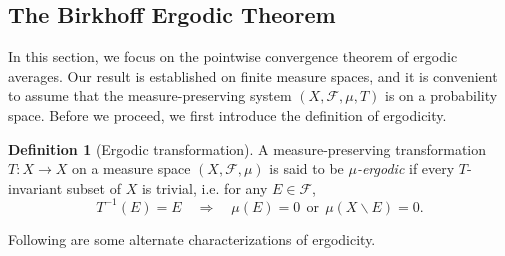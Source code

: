 \documentclass{article}
\numberwithin{equation}{section}
\newcommand{\scr}{\mathscr}
\theoremstyle{plain}
\theoremstyle{definition}
\newtheorem{definition}[theorem]{Definition}
\begin{document}
\subsection{The Birkhoff Ergodic Theorem}
In this section, we focus on the pointwise convergence theorem of ergodic averages. Our result is established on finite measure spaces, and it is convenient to assume that the measure-preserving system $(X,\scr{F},\mu,T)$ is on a probability space. Before we proceed, we first introduce the definition of ergodicity.
\begin{definition}[Ergodic transformation]
A measure-preserving transformation $T:X\to X$ on a measure space $(X,\scr{F},\mu)$ is said to be \textit{$\mu$-ergodic} if every $T$-invariant subset of $X$ is trivial, i.e. for any $E\in\scr{F}$, $$T^{-1}(E)=E\quad\Rightarrow\quad\mu(E)=0\ \ \text{or}\ \ \mu(X\backslash E)=0.$$
\end{definition}
Following are some alternate characterizations of ergodicity.
\end{document}
